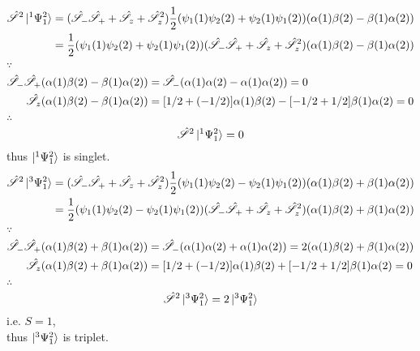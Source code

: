\documentclass[a4paper]{article}
\begin{document}
\subex{$ \bullet $}
\begin{align}
\hat{\mathscr{S}}^2\ket{^1\Psi_1^2} &= (\hat{\mathscr{S}}_-\hat{\mathscr{S}}_+ + \hat{\mathscr{S}}_z + \hat{\mathscr{S}}_z^2)\dfrac{1}{2}(\psi_1(1)\psi_2(2) + \psi_2(1)\psi_1(2))(\alpha(1)\beta(2) - \beta(1)\alpha(2)) \notag\\
&= \dfrac{1}{2}(\psi_1(1)\psi_2(2) + \psi_2(1)\psi_1(2))(\hat{\mathscr{S}}_-\hat{\mathscr{S}}_+ + \hat{\mathscr{S}}_z + \hat{\mathscr{S}}_z^2)(\alpha(1)\beta(2) - \beta(1)\alpha(2))
\end{align}
$ \because $
\begin{align}
\hat{\mathscr{S}}_-\hat{\mathscr{S}}_+ (\alpha(1)\beta(2) - \beta(1)\alpha(2)) &= \hat{\mathscr{S}}_-(\alpha(1)\alpha(2) - \alpha(1)\alpha(2)) = 0\\
\hat{\mathscr{S}}_z (\alpha(1)\beta(2) - \beta(1)\alpha(2)) &= [1/2+(-1/2)]\alpha(1)\beta(2) - [-1/2+1/2]\beta(1)\alpha(2) = 0
\end{align}
$ \therefore $
\begin{equation}\label{key}
\hat{\mathscr{S}}^2\ket{^1\Psi_1^2} = 0
\end{equation}
thus $ \ket{^1\Psi_1^2} $ is singlet.
\subex{$ \bullet $}
\begin{align}
\hat{\mathscr{S}}^2\ket{^3\Psi_1^2} &= (\hat{\mathscr{S}}_-\hat{\mathscr{S}}_+ + \hat{\mathscr{S}}_z + \hat{\mathscr{S}}_z^2)\dfrac{1}{2}(\psi_1(1)\psi_2(2) - \psi_2(1)\psi_1(2))(\alpha(1)\beta(2) + \beta(1)\alpha(2)) \notag\\
&= \dfrac{1}{2}(\psi_1(1)\psi_2(2) - \psi_2(1)\psi_1(2))(\hat{\mathscr{S}}_-\hat{\mathscr{S}}_+ + \hat{\mathscr{S}}_z + \hat{\mathscr{S}}_z^2)(\alpha(1)\beta(2) + \beta(1)\alpha(2))
\end{align}
$ \because $
\begin{align}
\hat{\mathscr{S}}_-\hat{\mathscr{S}}_+ (\alpha(1)\beta(2) + \beta(1)\alpha(2)) &= \hat{\mathscr{S}}_-(\alpha(1)\alpha(2) + \alpha(1)\alpha(2)) = 2(\alpha(1)\beta(2) + \beta(1)\alpha(2))\\
\hat{\mathscr{S}}_z (\alpha(1)\beta(2) + \beta(1)\alpha(2)) &= [1/2+(-1/2)]\alpha(1)\beta(2) + [-1/2+1/2]\beta(1)\alpha(2) = 0
\end{align}
$ \therefore $
\begin{equation}\label{key}
\hat{\mathscr{S}}^2\ket{^3\Psi_1^2} = 2\ket{^3\Psi_1^2}
\end{equation}
i.e. $ S=1 $,\\
thus $ \ket{^3\Psi_1^2} $ is triplet.
\end{document}
